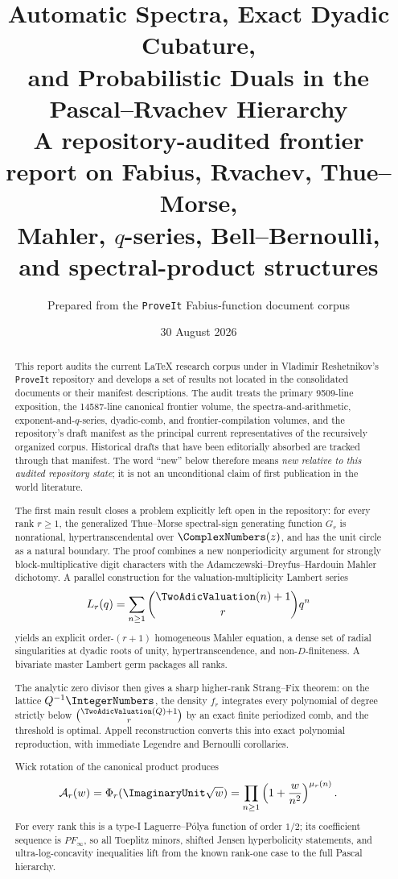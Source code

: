 \documentclass[11pt,oneside]{article}
\title{\bfseries Automatic Spectra, Exact Dyadic Cubature,\\
 and Probabilistic Duals in the Pascal--Rvachev Hierarchy\\[0.5em]
\large A repository-audited frontier report on Fabius, Rvachev, Thue--Morse,\\
Mahler, $q$-series, Bell--Bernoulli, and spectral-product structures}
\author{Prepared from the \texttt{ProveIt} Fabius-function document corpus}
\date{30 August 2026}
\theoremstyle{definition}
\theoremstyle{remark}
\newcommand{\Ar}{\mathcal A}
\begin{document}
\maketitle

\begin{abstract}
This report audits the current LaTeX research corpus under
 in Vladimir Reshetnikov's
\texttt{ProveIt} repository and develops a set of results not located in the
consolidated documents or their manifest descriptions.  The audit treats the
primary 9509-line exposition, the 14587-line canonical frontier volume, the
spectra-and-arithmetic, exponent-and-$q$-series, dyadic-comb, and frontier-compilation
volumes, and the repository's draft manifest as the principal current
representatives of the recursively organized corpus.  Historical drafts that
have been editorially absorbed are tracked through that manifest.  The word
``new'' below therefore means \emph{new relative to this audited repository
state}; it is not an unconditional claim of first publication in the world
literature.

The first main result closes a problem explicitly left open in the repository:
for every rank $r\geq1$, the generalized Thue--Morse spectral-sign generating
function $G_r$ is nonrational, hypertranscendental over $\ComplexNumbers(z)$, and has the
unit circle as a natural boundary.  The proof combines a new nonperiodicity
argument for strongly block-multiplicative digit characters with the
Adamczewski--Dreyfus--Hardouin Mahler dichotomy.  A parallel construction for
the valuation-multiplicity Lambert series
\[
 L_r(q)=\sum_{n\geq1}\binom{\TwoAdicValuation(n)+1}{r}q^n
\]
yields an explicit order-$(r+1)$ homogeneous Mahler equation, a dense set of
radial singularities at dyadic roots of unity, hypertranscendence, and
non-$D$-finiteness.  A bivariate master Lambert germ packages all ranks.

The analytic zero divisor then gives a sharp higher-rank Strang--Fix theorem:
on the lattice $Q^{-1}\IntegerNumbers$, the density $f_r$ integrates every polynomial of
degree strictly below $\binom{\TwoAdicValuation(Q)+1}{r}$ by an exact finite periodized
comb, and the threshold is optimal.  Appell reconstruction converts this into
exact polynomial reproduction, with immediate Legendre and Bernoulli
corollaries.

Wick rotation of the canonical product produces
\[
 \Ar_r(w)=\Phi_r(\ImaginaryUnit\sqrt w)
 =\prod_{n\geq1}\left(1+\frac{w}{n^2}\right)^{\mu_r(n)}.
\]
For every rank this is a type-I Laguerre--P\'olya function of order $1/2$;
its coefficient sequence is $PF_\infty$, so all Toeplitz minors, shifted
Jensen hyperbolicity statements, and ultra-log-concavity inequalities lift
from the known rank-one case to the full Pascal hierarchy.


\end{abstract}
\end{document}
